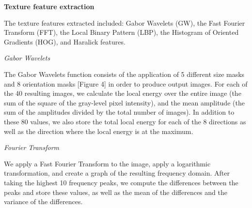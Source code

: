\textbf{Texture feature extraction}


The texture features extracted included: Gabor Wavelets\cite{Zheng_2004} (GW), the Fast Fourier Transform (FFT), the Local Binary Pattern (LBP), the Histogram of Oriented Gradients (HOG), and Haralick features.

    \textit{Gabor Wavelets}

The Gabor Wavelets function consists of the application of 5 different size masks and 8 orientation masks [Figure 4] in order to produce output images. For each of the 40 resulting images, we calculate the local energy over the entire image (the sum of the square of the gray-level pixel intensity), and the mean amplitude (the sum of the amplitudes divided by the total number of images). In addition to these 80 values, we also store the total local energy for each of the 8 directions as well as the direction where the local energy is at the maximum.

    \textit{Fourier Transform}

We apply a Fast Fourier Transform to the image, apply a logarithmic transformation, and create a graph of the resulting frequency domain. After taking the highest 10 frequency peaks, we compute the differences between the peaks and store these values, as well as the mean of the differences and the variance of the differences. 

    
    
    
    
    
  
  
  
  
  